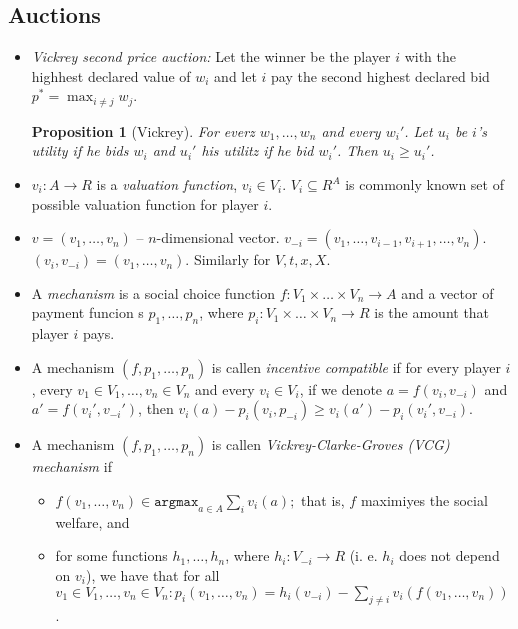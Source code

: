 \documentclass{article}
\newtheorem{proposition}{Proposition}
\theoremstyle{definition}
\begin{document}
\subsection{Auctions}
\begin{itemize}

\item \emph{Vickrey second price auction:} Let the winner be the player $i$ with the highhest
declared value of $w_i$ and let $i$ pay the second highest declared bid $p^* = \max_{i \neq j} w_j$.

\begin{proposition}[Vickrey]
For everz $w_1, \ldots, w_n$ and every $w_i'$. Let $u_i$ be $i$'s utility if he bids $w_i$ and $u_i'$
his utilitz if he bid $w_i'$. Then $u_i \geq u_i'$.
\end{proposition}

\item $v_i: A \to R$ is a \emph{valuation function}, $v_i \in V_i$. $V_i \subseteq R^A$ is commonly
known set of possible valuation function for player $i$.

\item $v = (v_1, \ldots, v_n)$ -- $n$-dimensional vector. $v_{-i} = (v_1, \ldots, v_{i-1}, v_{i+1}, \ldots, v_n)$.
$(v_{i}, v_{-i}) = (v_1, \ldots, v_n)$. Similarly for $V, t, x, X$.

\item A \emph{mechanism} is a social choice function $f: V_1 \times \ldots \times V_n \to A$
and a vector of payment funcion s $p_1, \ldots, p_n$, where $p_i: V_1 \times \ldots \times V_n \to R$
is the amount that player $i$ pays.

\item A mechanism $(f, p_1, \ldots, p_n)$ is callen \emph{incentive compatible} if for every player $i$,
every $v_1 \in V_1, \ldots, v_n \in V_n$ and every $v_i \in V_i$, if we denote $a = f(v_i, v_{-i})$
and $a' = f(v_i', v_{-i}')$, then $v_i(a) - p_i(v_i, p_{-i}) \geq v_i(a') - p_i(v_i', v_{-i})$.

\item A mechanism $(f, p_1, \ldots, p_n)$ is callen \emph{Vickrey-Clarke-Groves (VCG) mechanism} if
\begin{itemize}
\item $f(v_1, \ldots, v_n) \in \texttt{argmax}_{a \in A} \sum_i v_i(a);$ that is, $f$ maximiyes the social welfare, and
\item for some functions $h_1, \ldots, h_n$, where $h_i: V_{-i} \to R$ (i. e. $h_i$ does not depend on $v_i$),
we have that for all $v_1 \in V_1, \ldots, v_n \in V_n: p_i(v_1, \ldots, v_n) = h_i(v_{-i})
- \sum_{j \neq i} v_i(f(v_1, \ldots, v_n))$. 
\end{itemize}


\end{itemize}
\end{document}
